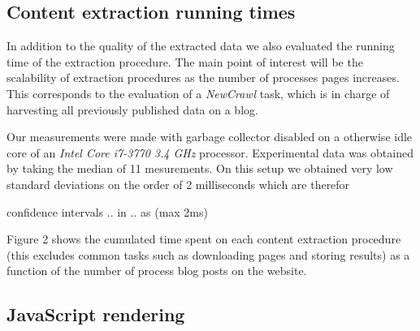 \subsection{Content extraction running times}

In addition to the quality of the extracted data we also evaluated the running time of the extraction procedure. The main point of interest will be the scalability of extraction procedures as the number of processes pages increases. This corresponds to the evaluation of a \emph{NewCrawl} task, which is in charge of harvesting all previously published data on a blog.

Our measurements were made with garbage collector disabled on a otherwise idle core of an \emph{Intel Core i7-3770 3.4 GHz} processor. Experimental data was obtained by taking the median of 11 mesurements. On this setup we obtained very low standard deviations on the order of 2 milliseconds which are therefor

confidence intervals .. in .. as (max 2ms)

Figure 2 shows the cumulated time spent on each content extraction procedure (this excludes common tasks such as downloading pages and storing results) as a function of the number of process blog posts on the  website.





\subsection{JavaScript rendering}





